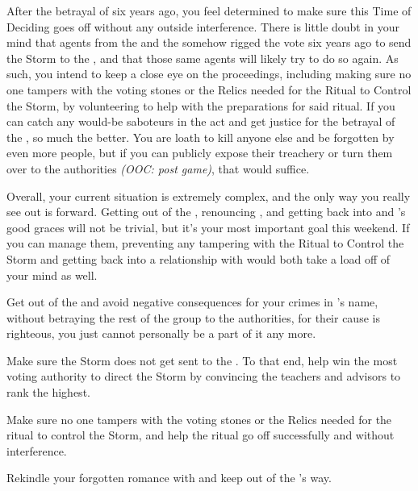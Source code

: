 \documentclass[char]{GL2020}
\begin{document}
After the betrayal of six years ago, you feel determined to make sure this Time of Deciding goes off without any outside interference. There is little doubt in your mind that agents from the \pTech{} and the \pFarm{} somehow rigged the vote six years ago to send the Storm to the \pShip{}, and that those same agents will likely try to do so again. As such, you intend to keep a close eye on the proceedings, including making sure no one tampers with the voting stones or the Relics needed for the Ritual to Control the Storm, by volunteering to help with the preparations for said ritual. If you can catch any would-be saboteurs in the act and get justice for the betrayal of the \pShip{}, so much the better. You are loath to kill anyone else and be forgotten by even more people, but if you can publicly expose their treachery or turn them over to the \pShip{} authorities \emph{(OOC: post game)}, that would suffice.

Overall, your current situation is extremely complex, and the only way you really see out is forward. Getting out of the \pGoaties{}, renouncing \cGenesis{}, and getting back into \cEbb{} and \cFlow{}'s good graces will not be trivial, but it's your most important goal this weekend. If you can manage them, preventing any tampering with the Ritual to Control the Storm and getting back into a relationship with \cHeadScientist{} would both take a load off of your mind as well. 

\begin{itemz}
	\item Get out of the \pGoaties{} and avoid negative consequences for your crimes in \cGenesis{}'s name, without betraying the rest of the group to the authorities, for their cause is righteous, you just cannot personally be a part of it any more.
	\item Make sure the Storm does not get sent to the \pShip{}. To that end, help \cInitiate{} win the most voting authority to direct the Storm by convincing the \pFarm{} teachers and \pShip{} advisors to rank \cInitiate{\them} the highest.
	\item Make sure no one tampers with the voting stones or the Relics needed for the ritual to control the Storm, and help the ritual go off successfully and without interference. 
	\item Rekindle your forgotten romance with \cHeadScientist{} and keep \cHeadScientist{\them} out of the \pGoaties{}'s way.
\end{itemz}
\end{document}
